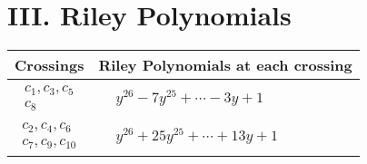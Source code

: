 \documentclass[1p]{elsarticle_modified}
\theoremstyle{definition}
\begin{document}
\centering \section*{ III. Riley Polynomials}
\begin{tabular}{m{50pt}|m{274pt}}
Crossings & \hspace{64pt}Riley Polynomials at each crossing \\
\hline $$\begin{aligned}c_{1},c_{3},c_{5}\\c_{8}\end{aligned}$$&$\begin{aligned}
&y^{26}-7 y^{25}+\cdots-3 y+1
\end{aligned}$\\
\hline $$\begin{aligned}c_{2},c_{4},c_{6}\\c_{7},c_{9},c_{10}\end{aligned}$$&$\begin{aligned}
&y^{26}+25 y^{25}+\cdots+13 y+1
\end{aligned}$\\
\hline
\end{tabular}
\vskip 2pc
\end{document}
